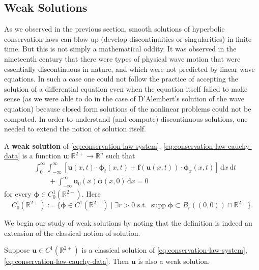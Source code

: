 \subsection{Weak Solutions}\label{sec:conservation-weak-solutions}

As we observed in the previous section, smooth solutions of hyperbolic conservation laws can blow up (develop discontinuities or singularities) in finite time. But this is not simply a mathematical oddity. It was observed in the nineteenth century that there were types of physical wave motion that were essentially discontinuous in nature, and which were not predicted by linear wave equations. In such a case one could not follow the practice of accepting the solution of a differential equation even when the equation itself failed to make sense (as we were able to do in the case of D'Alembert's solution of the wave equation) because closed form solutions of the nonlinear problems could not be computed. In order to understand (and compute) discontinuous solutions, one needed to extend the notion of solution itself.

\begin{Definition}
\label{def:conservation-weak-solution}
A \textbf{weak solution} of \eqref{eq:conservation-law-system}, \eqref{eq:conservation-law-cauchy-data} is a function $\bm{u}:\mathbb{R}^{2+}\to\mathbb{R}^n$ such that
\begin{equation}\label{eq:conservation-weak-solution}
\begin{aligned}
&\int_0^\infty\int_{-\infty}^\infty[\bm{u}(x,t)\cdot\bm{\phi}_t(x,t)+\bm{f}(\bm{u}(x,t))\cdot\bm{\phi}_x(x,t)]\,\mathrm{d}x\,\mathrm{d}t\\
&\qquad+\int_{-\infty}^\infty\bm{u}_0(x)\bm{\phi}(x,0)\,\mathrm{d}x=0
\end{aligned}
\end{equation}
for every $\bm{\phi}\in C_0^1(\mathbb{R}^{2+})$. Here
\begin{equation}\label{eq:conservation-test-function-space}
C_0^1(\mathbb{R}^{2+}):=\{\bm{\phi}\in C^1(\mathbb{R}^{2+})\mid\exists r>0\text{ s.t. }\operatorname{supp}\bm{\phi}\subset B_r((0,0))\cap\mathbb{R}^{2+}\}.
\end{equation}

\end{Definition}

We begin our study of weak solutions by noting that the definition is indeed an extension of the classical notion of solution.

\begin{Theorem}
\label{thm:classical-conservation-solutions-weak}
Suppose $\bm{u}\in C^1(\mathbb{R}^{2+})$ is a classical solution of \eqref{eq:conservation-law-system}, \eqref{eq:conservation-law-cauchy-data}. Then $\bm{u}$ is also a weak solution.
\end{Theorem}


